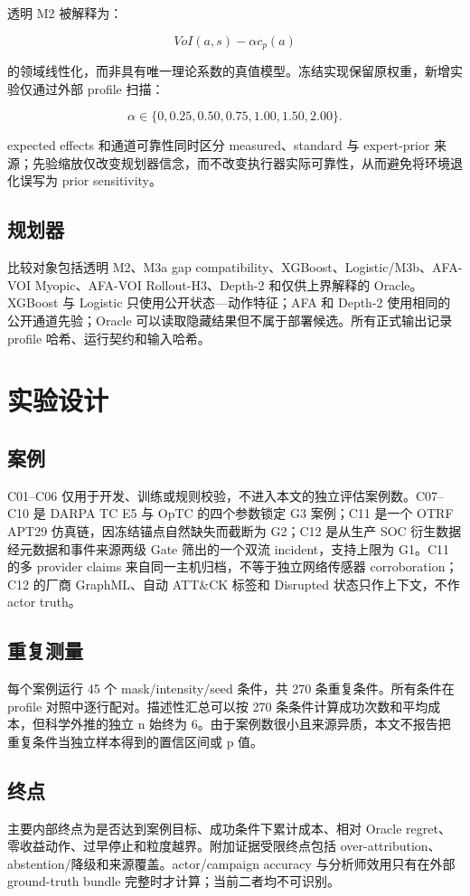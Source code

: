 \documentclass[conference,a4paper,10pt]{IEEEtran}
\begin{document}
透明 M2 被解释为：

\[
VoI(a,s)-\alpha c_p(a)
\]

的领域线性化，而非具有唯一理论系数的真值模型。冻结实现保留原权重，新增实验仅通过外部 profile 扫描：

\[
\alpha\in
\{0,0.25,0.50,0.75,1.00,1.50,2.00\}.
\]

expected effects 和通道可靠性同时区分 measured、standard 与 expert-prior 来源；先验缩放仅改变规划器信念，而不改变执行器实际可靠性，从而避免将环境退化误写为 prior sensitivity。
\subsection{规划器}
比较对象包括透明 M2、M3a gap compatibility、XGBoost、Logistic/M3b、AFA-VOI Myopic、AFA-VOI Rollout-H3、Depth-2 和仅供上界解释的 Oracle。XGBoost 与 Logistic 只使用公开状态—动作特征；AFA 和 Depth-2 使用相同的公开通道先验；Oracle 可以读取隐藏结果但不属于部署候选。所有正式输出记录 profile 哈希、运行契约和输入哈希。

\section{实验设计}
\subsection{案例}
C01–C06 仅用于开发、训练或规则校验，不进入本文的独立评估案例数。C07–C10 是 DARPA TC E5 与 OpTC 的四个参数锁定 G3 案例；C11 是一个 OTRF APT29 仿真链，因冻结锚点自然缺失而截断为 G2；C12 是从生产 SOC 衍生数据经元数据和事件来源两级 Gate 筛出的一个双流 incident，支持上限为 G1。C11 的多 provider claims 来自同一主机归档，不等于独立网络传感器 corroboration；C12 的厂商 GraphML、自动 ATT\&CK 标签和 Disrupted 状态只作上下文，不作 actor truth。

\subsection{重复测量}
每个案例运行 45 个 mask/intensity/seed 条件，共 270 条重复条件。所有条件在 profile 对照中逐行配对。描述性汇总可以按 270 条条件计算成功次数和平均成本，但科学外推的独立 n 始终为 6。由于案例数很小且来源异质，本文不报告把重复条件当独立样本得到的置信区间或 p 值。

\subsection{终点}
主要内部终点为是否达到案例目标、成功条件下累计成本、相对 Oracle regret、零收益动作、过早停止和粒度越界。附加证据受限终点包括 over-attribution、abstention/降级和来源覆盖。actor/campaign accuracy 与分析师效用只有在外部 ground-truth bundle 完整时才计算；当前二者均不可识别。
\end{document}
